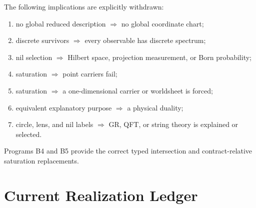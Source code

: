 \documentclass[11pt]{article}
\begin{document}
The following implications are explicitly withdrawn:
\begin{enumerate}
\item no global reduced description $\Rightarrow$ no global coordinate chart;
\item discrete survivors $\Rightarrow$ every observable has discrete
spectrum;
\item nil selection $\Rightarrow$ Hilbert space, projection measurement, or
Born probability;
\item saturation $\Rightarrow$ point carriers fail;
\item saturation $\Rightarrow$ a one-dimensional carrier or worldsheet is
forced;
\item equivalent explanatory purpose $\Rightarrow$ a physical duality;
\item circle, lens, and nil labels $\Rightarrow$ GR, QFT, or string theory is
explained or selected.
\end{enumerate}
Programs B4 and B5 provide the correct typed intersection and
contract-relative saturation replacements.

\clearpage
\section{Current Realization Ledger}
\end{document}
